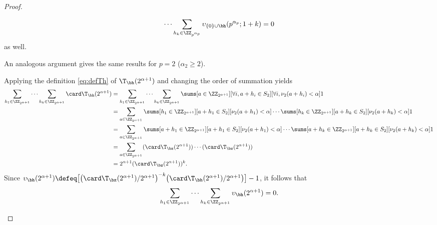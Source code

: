 \documentclass[12pt, reqno, twoside, letterpaper]{amsart}
\begin{document}
\begin{jetsam}
\begin{proof}
\begin{nixnix}
\[  \cdots 
   \sum_{h_k \in \ZZ_{p^{\alpha_p}}}
    \upsilon_{\{0\} \cup \bh}(p^{\alpha_p};1 + k)
   =
   0 
\]
as well.
%
\end{nixnix}
%
%
An analogous argument gives the same results for $p = 2$ 
($\alpha_2 \ge 2$).
%
%
\begin{nixnix}
%
Applying the definition \eqref{eq:defTh} of 
$\T_{\bh}(2^{\alpha + 1})$ and changing the order of summation 
yields 
\begin{align*}
  \sum_{h_1 \in \ZZ_{2^{\alpha + 1}}}
   \cdots 
    \sum_{h_k \in \ZZ_{2^{\alpha + 1}}}
     \card \T_{\bh}(2^{\alpha + 1})
  & = 
      \sum_{h_1 \in \ZZ_{2^{\alpha + 1}}}
       \cdots 
        \sum_{h_k \in \ZZ_{2^{\alpha + 1}}}
         \sums[a \in \ZZ_{2^{\alpha + 1}}][\forall i, a + h_i \in S_2][\forall i, \nu_2(a + h_i) < \alpha] 1
 \\ 
  & = 
   \sum_{a \in \ZZ_{2^{\alpha + 1}}}
    \sums[h_1 \in \ZZ_{2^{\alpha + 1}}][a + h_1 \in S_2][\nu_2(a + h_1) < \alpha]
     \cdots 
      \sums[h_k \in \ZZ_{2^{\alpha + 1}}][a + h_k \in S_2][\nu_2(a + h_k) < \alpha] 1
 \\
 & = 
   \sum_{a \in \ZZ_{2^{\alpha + 1}}}
    \sums[a + h_1 \in \ZZ_{2^{\alpha + 1}}][a + h_1 \in S_2][\nu_2(a + h_1) < \alpha]
     \cdots 
      \sums[a + h_k \in \ZZ_{2^{\alpha + 1}}][a + h_k \in S_2][\nu_2(a + h_k) < \alpha] 1   
 \\
 & = 
    \sum_{a \in \ZZ_{2^{\alpha + 1}}}
     (\card \T_{\bz}(2^{\alpha + 1}))
      \cdots 
       (\card \T_{\bz}(2^{\alpha + 1}))
 \\
 & = 
    2^{\alpha + 1}(\card \T_{\bz}(2^{\alpha + 1}))^k.
\end{align*}
%
Since 
$
 \upsilon_{\bh}(2^{\alpha + 1}) 
  \defeq 
   \big[
    \big(\card \T_{\bz}(2^{\alpha + 1})/2^{\alpha + 1}\big)^{-k}
     \big(\card \T_{\bh}(2^{\alpha + 1})/2^{\alpha + 1}\big) 
   \big] - 1
$, 
it follows that 
\[
 \sum_{h_1 \in \ZZ_{2^{\alpha + 1}}}
  \cdots 
   \sum_{h_k \in \ZZ_{2^{\alpha + 1}}}
    \upsilon_{\bh}(2^{\alpha + 1})
   =
   0.
\]
%
\end{nixnix}
%


\end{proof}
\end{jetsam}
\end{document}
